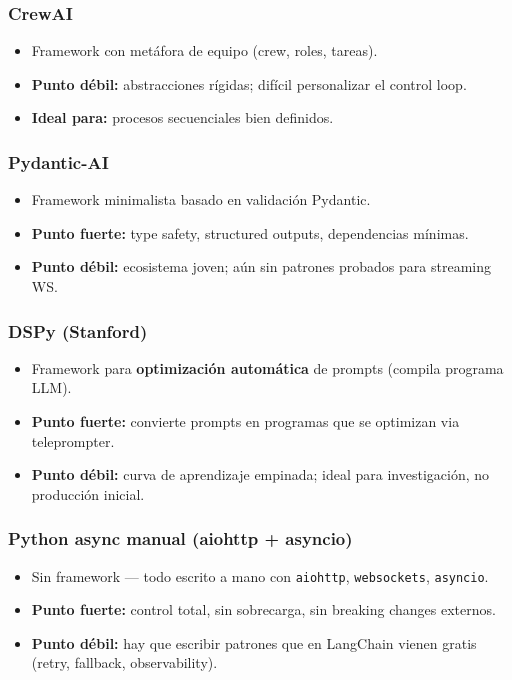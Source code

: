 \documentclass[11pt,a4paper]{article}
\begin{document}
\subsubsection{CrewAI}
\begin{itemize}[leftmargin=*,itemsep=0pt]
\item Framework con metáfora de equipo (crew, roles, tareas).
\item \textbf{Punto débil:} abstracciones rígidas; difícil personalizar el control loop.
\item \textbf{Ideal para:} procesos secuenciales bien definidos.
\end{itemize}

\subsubsection{Pydantic-AI}
\begin{itemize}[leftmargin=*,itemsep=0pt]
\item Framework minimalista basado en validación Pydantic.
\item \textbf{Punto fuerte:} type safety, structured outputs, dependencias mínimas.
\item \textbf{Punto débil:} ecosistema joven; aún sin patrones probados para streaming WS.
\end{itemize}

\subsubsection{DSPy (Stanford)}
\begin{itemize}[leftmargin=*,itemsep=0pt]
\item Framework para \textbf{optimización automática} de prompts (compila programa LLM).
\item \textbf{Punto fuerte:} convierte prompts en programas que se optimizan via teleprompter.
\item \textbf{Punto débil:} curva de aprendizaje empinada; ideal para investigación, no producción inicial.
\end{itemize}

\subsubsection{Python async manual (aiohttp + asyncio)}
\begin{itemize}[leftmargin=*,itemsep=0pt]
\item Sin framework — todo escrito a mano con \texttt{aiohttp}, \texttt{websockets}, \texttt{asyncio}.
\item \textbf{Punto fuerte:} control total, sin sobrecarga, sin breaking changes externos.
\item \textbf{Punto débil:} hay que escribir patrones que en LangChain vienen gratis (retry, fallback, observability).
\end{itemize}
\end{document}
